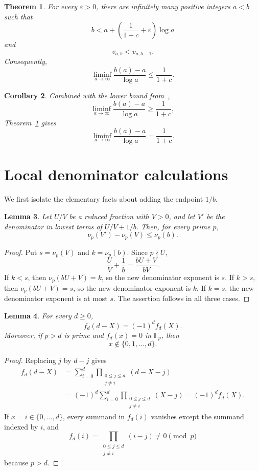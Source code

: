 \documentclass[11pt]{article}
\newtheorem{theorem}{Theorem}
\newtheorem{lemma}[theorem]{Lemma}
\newtheorem{corollary}[theorem]{Corollary}
\newcommand{\F}{\mathbb F}
\begin{document}
\begin{theorem}\label{thm:main}
For every $\varepsilon>0$, there are infinitely many positive integers $a<b$ such that
\[
  b<a+\left(\frac1{1+c}+\varepsilon\right)\log a
\]
and
\[
  v_{a,b}<v_{a,b-1}.
\]
Consequently,
\[
  \liminf_{a\to\infty}\frac{b(a)-a}{\log a}\leq\frac1{1+c}.
\]
\end{theorem}

\begin{corollary}
Combined with the lower bound from~\cite{VD},
\[
  \liminf_{a\to\infty}\frac{b(a)-a}{\log a}\geq\frac1{1+c},
\]
Theorem~\ref{thm:main} gives
\[
  \liminf_{a\to\infty}\frac{b(a)-a}{\log a}=\frac1{1+c}.
\]
\end{corollary}

\section{Local denominator calculations}

We first isolate the elementary facts about adding the endpoint $1/b$.

\begin{lemma}\label{lem:endpoint}
Let $U/V$ be a reduced fraction with $V>0$, and let $V'$ be the denominator in lowest terms of $U/V+1/b$. Then, for every prime $p$,
\[
  \nu_p(V')-\nu_p(V)\leq \nu_p(b).
\]
\end{lemma}

\begin{proof}
Put $s=\nu_p(V)$ and $k=\nu_p(b)$. Since $p\nmid U$,
\[
  \frac UV+\frac1b=\frac{bU+V}{bV}.
\]
If $k<s$, then $\nu_p(bU+V)=k$, so the new denominator exponent is $s$. If $k>s$, then $\nu_p(bU+V)=s$, so the new denominator exponent is $k$. If $k=s$, the new denominator exponent is at most $s$. The assertion follows in all three cases.
\end{proof}

\begin{lemma}\label{lem:poly}
For every $d\geq0$,
\begin{equation}\label{eq:symmetry}
  f_d(d-X)=(-1)^d f_d(X).
\end{equation}
Moreover, if $p>d$ is prime and $f_d(x)=0$ in $\F_p$, then
\begin{equation}\label{eq:root-avoidance}
  x\notin\{0,1,\ldots,d\}.
\end{equation}
\end{lemma}

\begin{proof}
Replacing $j$ by $d-j$ gives
\[
\begin{aligned}
  f_d(d-X)
  &=\sum_{i=0}^{d}\prod_{\substack{0\leq j\leq d\\j\neq i}}(d-X-j)\\
  &=(-1)^d\sum_{i=0}^{d}\prod_{\substack{0\leq j\leq d\\j\neq i}}(X-j)
   =(-1)^d f_d(X).
\end{aligned}
\]
If $x=i\in\{0,\ldots,d\}$, every summand in $f_d(i)$ vanishes except the summand indexed by $i$, and
\[
  f_d(i)=\prod_{\substack{0\leq j\leq d\\j\neq i}}(i-j)\neq0\pmod p
\]
because $p>d$.
\end{proof}
\end{document}
